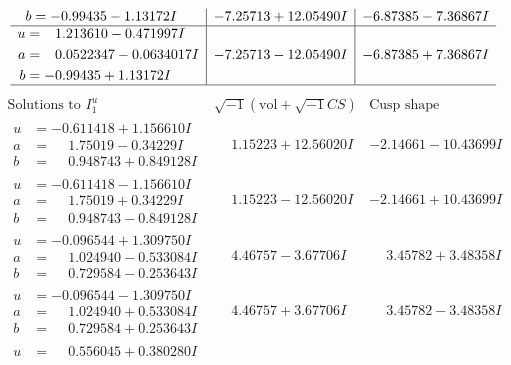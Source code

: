 \documentclass[1p]{elsarticle_modified}
\theoremstyle{definition}
\newcommand{\I}{\sqrt{-1}}
\begin{document}
$$\begin{array}{c|c|c}
\begin{aligned}
b &= -0.99435 - 1.13172 I\end{aligned}
 & -7.25713 + 12.05490 I & -6.87385 - 7.36867 I \\ \hline\begin{aligned}
u &= \phantom{-}1.213610 - 0.471997 I \\
a &= \phantom{-}0.0522347 - 0.0634017 I \\
b &= -0.99435 + 1.13172 I\end{aligned}
 & -7.25713 - 12.05490 I & -6.87385 + 7.36867 I\\
 \hline 
 \end{array}$$\newpage$$\begin{array}{c|c|c}  
\text{Solutions to }I^u_{1}& \I (\text{vol} + \sqrt{-1}CS) & \text{Cusp shape}\\
 \hline 
\begin{aligned}
u &= -0.611418 + 1.156610 I \\
a &= \phantom{-}1.75019 - 0.34229 I \\
b &= \phantom{-}0.948743 + 0.849128 I\end{aligned}
 & \phantom{-}1.15223 + 12.56020 I & -2.14661 - 10.43699 I \\ \hline\begin{aligned}
u &= -0.611418 - 1.156610 I \\
a &= \phantom{-}1.75019 + 0.34229 I \\
b &= \phantom{-}0.948743 - 0.849128 I\end{aligned}
 & \phantom{-}1.15223 - 12.56020 I & -2.14661 + 10.43699 I \\ \hline\begin{aligned}
u &= -0.096544 + 1.309750 I \\
a &= \phantom{-}1.024940 - 0.533084 I \\
b &= \phantom{-}0.729584 - 0.253643 I\end{aligned}
 & \phantom{-}4.46757 - 3.67706 I & \phantom{-}3.45782 + 3.48358 I \\ \hline\begin{aligned}
u &= -0.096544 - 1.309750 I \\
a &= \phantom{-}1.024940 + 0.533084 I \\
b &= \phantom{-}0.729584 + 0.253643 I\end{aligned}
 & \phantom{-}4.46757 + 3.67706 I & \phantom{-}3.45782 - 3.48358 I \\ \hline\begin{aligned}
u &= \phantom{-}0.556045 + 0.380280 I \\

\end{aligned}
\end{array}$$
\end{document}

